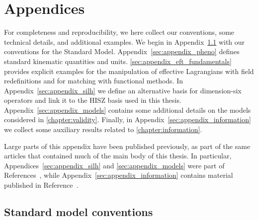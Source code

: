 



\chapter{Appendices}

For completeness and reproducibility, we here collect our conventions,
some technical details, and additional examples. We begin in
Appendix~\ref{sec:appendix_sm} with our conventions for the Standard
Model. Appendix~\ref{sec:appendix_pheno} defines standard kinematic
quantities and units. \autoref{sec:appendix_eft_fundamentals} provides
explicit examples for the manipulation of effective Lagrangians with
field redefinitions and for matching with functional methods. In
Appendix~\ref{sec:appendix_silh} we define an alternative basis for
dimension-six operators and link it to the HISZ basis used in this
thesis. Appendix~\ref{sec:appendix_models} contains some additional
details on the models considered in
\autoref{chapter:validity}. Finally, in
Appendix~\ref{sec:appendix_information} we collect some auxiliary
results related to \autoref{chapter:information}.

Large parts of this appendix have been published previously, as part
of the same articles that contained much of the main body of this
thesis. In particular, Appendices~\ref{sec:appendix_silh} and
\ref{sec:appendix_models} were part of
References~\cite{Brehmer:2015rna, Biekotter:2016ecg}, while
Appendix~\ref{sec:appendix_information} contains material published in
Reference~\cite{Brehmer:2016nyr}.



\section{Standard model conventions}
\label{sec:appendix_sm}

